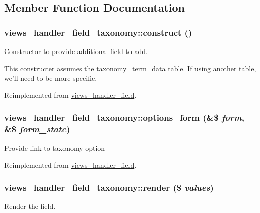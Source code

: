 \subsection{Member Function Documentation}
\hypertarget{classviews__handler__field__taxonomy_a7020806fbe7b4b7c182c422dd327b0fc}{
\subsubsection[{construct}]{\setlength{\rightskip}{0pt plus 5cm}views\_\-handler\_\-field\_\-taxonomy::construct ()}}
\label{classviews__handler__field__taxonomy_a7020806fbe7b4b7c182c422dd327b0fc}
Constructor to provide additional field to add.

This constructer assumes the taxonomy\_\-term\_\-data table. If using another table, we'll need to be more specific. 

Reimplemented from \hyperlink{classviews__handler__field_a3d50050864c255b71c842972a45d39f6}{views\_\-handler\_\-field}.\hypertarget{classviews__handler__field__taxonomy_adf66d3026b9409dd3237c5ebef994595}{
\subsubsection[{options\_\-form}]{\setlength{\rightskip}{0pt plus 5cm}views\_\-handler\_\-field\_\-taxonomy::options\_\-form (\&\$ {\em form}, \/  \&\$ {\em form\_\-state})}}
\label{classviews__handler__field__taxonomy_adf66d3026b9409dd3237c5ebef994595}
Provide link to taxonomy option 

Reimplemented from \hyperlink{classviews__handler__field_a0435d161922b7b4b84f02a2e79bb947a}{views\_\-handler\_\-field}.\hypertarget{classviews__handler__field__taxonomy_a02a50e2e97c9faf4e86c5461edf5d547}{
\subsubsection[{render}]{\setlength{\rightskip}{0pt plus 5cm}views\_\-handler\_\-field\_\-taxonomy::render (\$ {\em values})}}
\label{classviews__handler__field__taxonomy_a02a50e2e97c9faf4e86c5461edf5d547}
Render the field.


